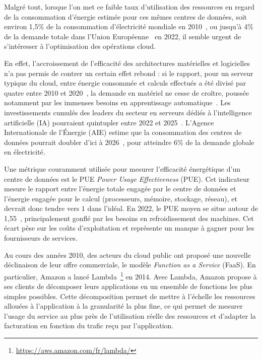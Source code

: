Malgré tout, lorsque l'on met ce faible taux d'utilisation des ressources en regard de la consommation d'énergie estimée pour ces mêmes centres de données, soit environ 1,5\% de la consommation d'électricité mondiale en 2010~\cite{masanetRecalibratingGlobalData2020}, ou jusqu'à 4\% de la demande totale dans l'Union Européenne~\cite{Electricity2024Analysis2024} en 2022, il semble urgent de s'intéresser à l'optimisation des opérations cloud.

En effet, l'accroissement de l'efficacité des architectures matérielles et logicielles n'a pas permis de contrer un certain effet rebond : si le rapport, pour un serveur typique du cloud, entre énergie consommée et calculs effectués a été divisé par quatre entre 2010 et 2020~\cite{masanetRecalibratingGlobalData2020}, la demande en matériel ne cesse de croître, poussée notamment par les immenses besoins en apprentissage automatique~\cite{commentMetaOperate6002024}. Les investissements cumulés des leaders du secteur en serveurs dédiés à l'intelligence artificielle (IA) pourraient quintupler entre 2022 et 2025~\cite{DerriereIADeferlante2024, elderNextWaveAI2024}. L'Agence Internationale de l'Énergie (\gls{AIE}) estime que la consommation des centres de données pourrait doubler d'ici à 2026~\cite{Electricity2024Analysis2024}, pour atteindre 6\% de la demande globale en électricité.

Une métrique couramment utilisée pour mesurer l'efficacité énergétique d'un centre de données est le PUE \textit{Power Usage Effectiveness} (\gls{PUE}). Cet indicateur mesure le rapport entre l'énergie totale engagée par le centre de données et l'énergie engagée pour le calcul (processeurs, mémoire, stockage, réseau), et devrait donc tendre vers $1$ dans l'idéal. En 2022, le \gls{PUE} moyen se situe autour de 1,55~\cite{davisUptimeInstituteGlobal2022}, principalement gonflé par les besoins en refroidissement des machines. Cet écart pèse sur les coûts d'exploitation et représente un manque à gagner pour les fournisseurs de services.

Au cours des années 2010, des acteurs du cloud public ont proposé une nouvelle déclinaison de leur offre commerciale, le modèle \textit{Function as a Service} (FaaS). En particulier, Amazon a lancé Lambda~\footnote{\href{https://aws.amazon.com/fr/lambda/}{https://aws.amazon.com/fr/lambda/}} en 2014. Avec Lambda, Amazon propose à ses clients de décomposer leurs applications en un ensemble de fonctions les plus simples possibles. Cette décomposition permet de mettre à l'échelle les ressources allouées à l'application à la granularité la plus fine, ce qui permet de mesurer l'usage du service au plus près de l'utilisation réelle des ressources et d'adapter la facturation en fonction du trafic reçu par l'application.

